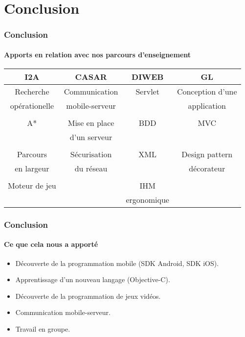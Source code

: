 \section{Conclusion}

\begin{frame}
\frametitle{Conclusion}
\framesubtitle{Apports en relation avec nos parcours d'enseignement}
\begin{tabular}{c|c|c|c}

I2A & CASAR & DIWEB & GL \\\hline
Recherche   &  Communication  &  Servlet  & Conception d'une  \\
 opérationelle  & mobile-serveur &   & application \\
                           &                              &                &                   \\
A* & Mise en place  & BDD & MVC \\
      &d'un serveur & & \\
                           &                              &                &                   \\
Parcours  &  Sécurisation   & XML  & Design pattern  \\
en largeur & du réseau & & décorateur \\

                           &                              &                &                   \\

Moteur de jeu & & IHM  & \\
           &           &        ergonomique        &        \\

\end{tabular}

\end{frame}



\begin{frame}
\frametitle{Conclusion}
\framesubtitle{Ce que cela nous a apporté}
\begin{itemize}
	\item Découverte de la programmation mobile (SDK Android, SDK iOS).
	\item Apprentissage d'un nouveau langage (Objective-C).
	\item Découverte de la programmation de jeux vidéos.
	\item Communication mobile-serveur.
	\item Travail en groupe.
\end{itemize}
\end{frame}
